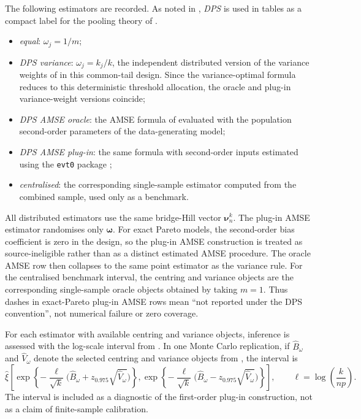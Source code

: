 The following estimators are recorded. As noted in ,
\emph{DPS} is used in tables as a compact label for the
pooling theory of \textcite{DaouiaPadoanStupfler2021}.
\begin{itemize}
\item \emph{equal}: \(\omega_j=1/m\);
\item \emph{DPS variance}: \(\omega_j=k_j/k\), the independent distributed
      version of the variance weights of
      \textcite{DaouiaPadoanStupfler2021} in this common-tail design. Since the
      variance-optimal formula reduces to this deterministic threshold
      allocation, the oracle and plug-in variance-weight versions coincide;
\item \emph{DPS AMSE oracle}: the AMSE formula of
      \textcite{DaouiaPadoanStupfler2021} evaluated with the population
      second-order parameters of the data-generating model;
\item \emph{DPS AMSE plug-in}: the same formula with second-order inputs
      estimated using the \texttt{evt0} package \parencite{evt0R};
\item \emph{centralised}: the corresponding single-sample estimator computed
      from the combined sample, used only as a benchmark.
\end{itemize}
All distributed estimators use the same bridge-Hill vector
\(\bm\nu_n^k\). The plug-in AMSE estimator randomises only
\(\bm\omega\). For exact Pareto models, the second-order bias coefficient is
zero in the design, so the plug-in AMSE construction is treated as
source-ineligible
rather than as a distinct estimated AMSE procedure. The oracle AMSE row then
collapses to the same point estimator as the variance rule. For the
centralised benchmark interval, the centring and variance objects are the
corresponding single-sample oracle objects obtained by taking \(m=1\). Thus
dashes in exact-Pareto plug-in AMSE rows mean ``not reported under the DPS
convention'', not numerical failure or zero coverage.

For each estimator with available centring and variance objects, inference is
assessed with the log-scale interval from
. In one Monte Carlo replication, if
\(\widehat B_\omega\) and \(\widehat V_\omega\) denote the selected
centring and variance objects from
\textcite[\S2.2 and Corollary~1; Corollaries~6--7]{DaouiaPadoanStupfler2021},
the interval is
\[
  \widehat\xi
  \left[
    \exp\!\left\{-\frac{\ell}{\sqrt{k}}
      \big(\widehat B_\omega+z_{0.975}\sqrt{\widehat V_\omega}\big)\right\},
    \exp\!\left\{-\frac{\ell}{\sqrt{k}}
      \big(\widehat B_\omega-z_{0.975}\sqrt{\widehat V_\omega}\big)\right\}
  \right],
  \qquad
  \ell=\log\!\left(\frac{k}{np}\right).
\]
The interval is included as a diagnostic of the first-order plug-in
construction, not as a claim of finite-sample calibration.


